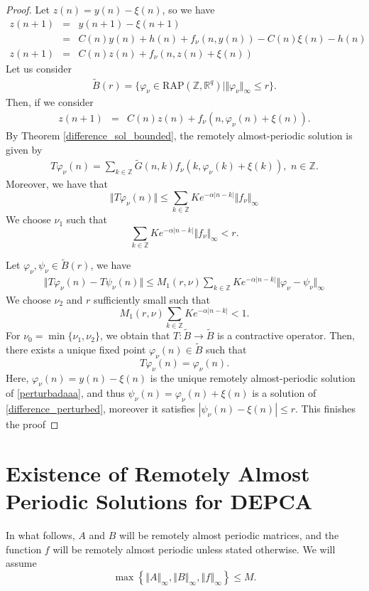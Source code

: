 \documentclass[english,,reqno]{amsart}
\numberwithin{equation}{section}
\newcommand{\bb}[1]{\mathbb{#1}}
\theoremstyle{plain}
\theoremstyle{definition}
\theoremstyle{remark}
\begin{document}
\begin{proof}
Let $z(n) = y(n) - \xi(n)$, so we have
\begin{eqnarray*}
z(n+1)&=&y(n+1)-\xi(n+1)\\
&=& C(n)y(n)+h(n)+f_{\nu}(n,y(n))-C(n)\xi(n)-h(n)\\
z(n+1)&=& C(n)z(n)+f_{\nu}(n,z(n)+\xi(n))
\end{eqnarray*}
Let us consider
\begin{eqnarray*}
\tilde{B}(r)= \{\varphi_{\nu}\in \mbox{RAP}(\mathbb{Z},\bb{R}^q) \vert \Vert \varphi_{\nu }\Vert_{\infty}\leq r \}.
\end{eqnarray*}
Then, if we consider  
\begin{eqnarray*}
z(n+1) &=& C(n)z(n) + f_{\nu}(n, \varphi_{\nu}(n) + \xi(n)). \label{perturbadaaa}
\end{eqnarray*}  
By Theorem \ref{difference_sol_bounded}, the remotely almost-periodic solution is given by
\begin{eqnarray*}
T\varphi_{\nu}(n)=\sum_{k\in \bb{Z}} \tilde{G}(n,k)f_{\nu}(k,\varphi_{\nu}(k)+\xi(k)),\, \, n\in \bb{Z}.
\end{eqnarray*}
Moreover, we have that  
\[
\Vert T\varphi_{\nu}(n) \Vert \leq \sum_{k \in \mathbb{Z}} K e^{-\alpha |n - k|} \Vert f_{\nu} \Vert_{\infty}
\]  
We choose $\nu_1$ such that  
\[
\sum_{k \in \mathbb{Z}} K e^{-\alpha |n - k|} \Vert f_{\nu} \Vert_{\infty} < r.
\]  

Let $\varphi_{\nu}, \psi_{\nu} \in \tilde{B}(r)$, we have
\begin{eqnarray*}
\Vert T\varphi_{\nu}(n)-T\psi_{\nu}(n)\Vert\leq M_{1}(r,\nu)\sum_{k\in\bb{Z}}Ke^{-\alpha\vert n-k\vert}\Vert\varphi_{\nu}-\psi_{\nu}\Vert_{\infty}
\end{eqnarray*} 
We choose $\nu_2$ and $r$ sufficiently small such that  
\[
M_1(r,\nu) \sum_{k \in \mathbb{Z}} K e^{-\alpha |n - k|} < 1.
\]  
For $\nu_0 = \min\{\nu_1, \nu_2\}$, we obtain that $T: \tilde{B} \rightarrow \tilde{B}$ is a contractive operator. Then, there exists a unique fixed point $\varphi_{\nu}(n) \in \tilde{B}$ such that  
\[
T\varphi_{\nu}(n) = \varphi_{\nu}(n).
\]  
Here, $\varphi_{\nu}(n) = y(n) - \xi(n)$ is the unique remotely almost-periodic solution of \eqref{perturbadaaa},  
and thus $\psi_{\nu}(n) = \varphi_{\nu}(n) + \xi(n)$ is a solution of \eqref{difference_perturbed},  
moreover it satisfies $\left| \psi_{\nu}(n) - \xi(n) \right| \leq r$. This finishes the proof
\end{proof}

\section{Existence of Remotely Almost Periodic Solutions for DEPCA}
\label{sec5}
In what follows, $A$ and $B$ will be remotely almost periodic matrices, and the function $f$ will be remotely almost periodic unless stated otherwise.  
We will assume  
\[
\max\left\{ \left\Vert A \right\Vert_{\infty}, \left\Vert B \right\Vert_{\infty}, \left\Vert f \right\Vert_{\infty} \right\} \leq M.
\]
\end{document}
